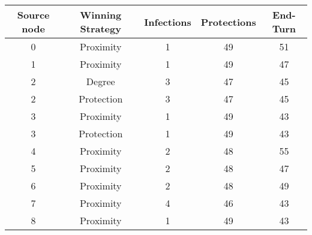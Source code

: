 \documentclass[results.tex]{subfiles}
\begin{document}
    \begin{center}
        \begin{tabular}{| c || c | c | c | c |}
            \hline
            {\bfseries Source node} & {\bfseries Winning Strategy} & {\bfseries Infections} & {\bfseries Protections}
            & {\bfseries End-Turn}
            \\  %
            \hline\hline
            0                       & Proximity                    & 1                      & 49                      & 51                   \\
            \hline
            1                       & Proximity                    & 1                      & 49                      & 47                   \\
            \hline
            2                       & Degree                       & 3                      & 47                      & 45                   \\
            \hline
            2                       & Protection                   & 3                      & 47                      & 45                   \\
            \hline
            3                       & Proximity                    & 1                      & 49                      & 43                   \\
            \hline
            3                       & Protection                   & 1                      & 49                      & 43                   \\
            \hline
            4                       & Proximity                    & 2                      & 48                      & 55                   \\
            \hline
            5                       & Proximity                    & 2                      & 48                      & 47                   \\
            \hline
            6                       & Proximity                    & 2                      & 48                      & 49                   \\
            \hline
            7                       & Proximity                    & 4                      & 46                      & 43                   \\
            \hline
            8                       & Proximity                    & 1                      & 49                      & 43                   \\

\end{tabular}
\end{center}
\end{document}

